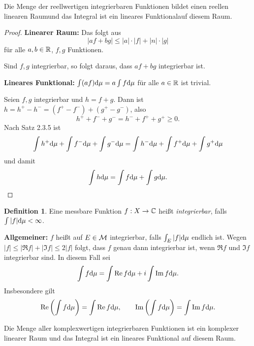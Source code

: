 \documentclass[
 a4paper,
 12pt,
 parskip=half
 ]{scrreprt}
\theoremstyle{plain}
\theoremstyle{definition}
\newtheorem{defn}[thm]{Definition}
\numberwithin{equation}{section}
\begin{document}
\begin{lem}
 Die Menge der reellwertigen integrierbaren Funktionen bildet einen reellen linearen Raum\footnotemark und das Integral ist ein lineares Funktional\footnotemark auf diesem Raum.
\end{lem}
 \addtocounter{footnote}{-2} %

\begin{proof}
 \textbf{Linearer Raum:} Das folgt aus
 \[ | af + bg | \le |a| \cdot |f| + |n| \cdot |g| \]
 für alle $a,b \in \mathbb{R}$, $f,g$ Funktionen.
 
 Sind $f,g$ integrierbar, so folgt daraus, dass $af + bg$ integrierbar ist.
 
 \textbf{Lineares Funktional:} $\int (af) \mathrm{d} \mu = a \int f \mathrm{d} \mu$ für alle $a \in \mathbb{R}$ ist trivial.
 
 Seien $f,g$ integrierbar und $h = f+g$. Dann ist $h = h^+ - h^- = (f^+ - f^-) + (g^+ - g^-)$, also
 \[ h^+ + f^- + g^- = h^- + f^+ + g^+ \ge 0. \]
 Nach Satz 2.3.5 ist
 \[ \int h^+ \mathrm{d} \mu + \int f^- \mathrm{d} \mu + \int g^- \mathrm{d} \mu = \int h^- \mathrm{d} \mu + \int f^+ \mathrm{d} \mu + \int g^+ \mathrm{d} \mu \]
 und damit
 \[ \int h \mathrm{d} \mu = \int f \mathrm{d} \mu + \int g \mathrm{d} \mu. \qedhere \]
\end{proof}

\begin{defn}
 Eine messbare Funktion $f: X \to \mathbb{C}$ heißt \emph{integrierbar}, falls $\int |f| \mathrm{d} \mu < \infty$.
 
 \textbf{Allgemeiner:} $f$ heißt auf $E \in \mathcal{M}$ integrierbar, falls $\int_E |f| \mathrm{d} \mu$ endlich ist. Wegen $|f| \le |\Re f| + |\Im f| \le 2 |f|$ folgt, dass $f$ genau dann integrierbar ist, wenn $\Re f$ und $\Im f$ integrierbar sind. In diesem Fall sei
 \[ \int f \mathrm{d} \mu = \int \operatorname{Re} f \mathrm{d} \mu + i \int \operatorname{Im} f \mathrm{d} \mu. \]
 Insbesondere gilt
 \[ \operatorname{Re} \left( \int f \mathrm{d} \mu \right) = \int \operatorname{Re} f \mathrm{d} \mu, \qquad
    \operatorname{Im} \left( \int f \mathrm{d} \mu \right) = \int \operatorname{Im} f \mathrm{d} \mu. \]
\end{defn}

\begin{lem}
 Die Menge aller komplexwertigen integrierbaren Funktionen ist ein komplexer linearer Raum und das Integral ist ein lineares Funktional auf diesem Raum.
\end{lem}
\end{document}
